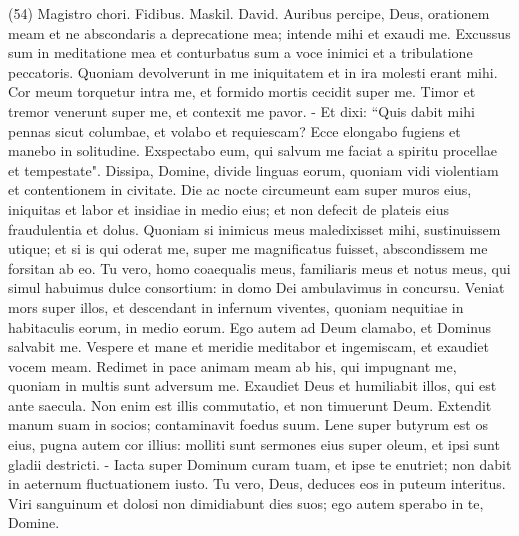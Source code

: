 \begin{biblechapter}  (54) 
\verse  Magistro chori. Fidibus. Maskil. David. 
\verse Auribus percipe, Deus, orationem meam et ne abscondaris a deprecatione mea; 
\verse intende mihi et exaudi me. Excussus sum in meditatione mea et conturbatus sum 
\verse a voce inimici et a tribulatione peccatoris. Quoniam devolverunt in me iniquitatem et in ira molesti erant mihi. 
\verse Cor meum torquetur intra me, et formido mortis cecidit super me. 
\verse Timor et tremor venerunt super me, et contexit me pavor. - 
\verse Et dixi: “Quis dabit mihi pennas sicut columbae, et volabo et requiescam? 
\verse Ecce elongabo fugiens et manebo in solitudine. 
\verse Exspectabo eum, qui salvum me faciat a spiritu procellae et tempestate". 
\verse Dissipa, Domine, divide linguas eorum, quoniam vidi violentiam et contentionem in civitate. 
\verse Die ac nocte circumeunt eam super muros eius, 
\verse iniquitas et labor et insidiae in medio eius; et non defecit de plateis eius fraudulentia et dolus. 
\verse Quoniam si inimicus meus maledixisset mihi, sustinuissem utique; et si is qui oderat me, super me magnificatus fuisset, abscondissem me forsitan ab eo. 
\verse Tu vero, homo coaequalis meus, familiaris meus et notus meus, 
\verse qui simul habuimus dulce consortium: in domo Dei ambulavimus in concursu. 
\verse Veniat mors super illos, et descendant in infernum viventes, quoniam nequitiae in habitaculis eorum, in medio eorum. 
\verse Ego autem ad Deum clamabo, et Dominus salvabit me. 
\verse Vespere et mane et meridie meditabor et ingemiscam, et exaudiet vocem meam. 
\verse Redimet in pace animam meam ab his, qui impugnant me, quoniam in multis sunt adversum me. 
\verse Exaudiet Deus et humiliabit illos, qui est ante saecula. Non enim est illis commutatio, et non timuerunt Deum. 
\verse Extendit manum suam in socios; contaminavit foedus suum. 
\verse Lene super butyrum est os eius, pugna autem cor illius: molliti sunt sermones eius super oleum, et ipsi sunt gladii destricti. - 
\verse Iacta super Dominum curam tuam, et ipse te enutriet; non dabit in aeternum fluctuationem iusto. 
\verse Tu vero, Deus, deduces eos in puteum interitus. Viri sanguinum et dolosi non dimidiabunt dies suos; ego autem sperabo in te, Domine. 
\end{biblechapter}

